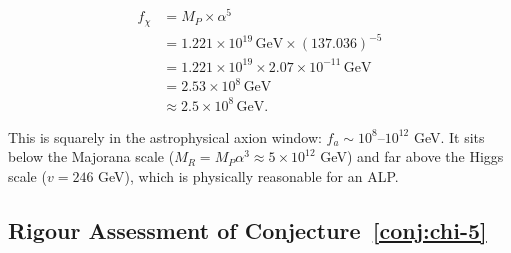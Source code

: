 \documentclass[11pt]{article}
\theoremstyle{definition}
\theoremstyle{remark}
\begin{document}
\begin{align}
f_\chi &= M_P \times \alpha^5 \\
&= 1.221 \times 10^{19}\,\text{GeV} \times (137.036)^{-5} \\
&= 1.221 \times 10^{19} \times 2.07 \times 10^{-11}\,\text{GeV} \\
&= 2.53 \times 10^{8}\,\text{GeV} \\
&\approx 2.5 \times 10^{8}\,\text{GeV}.
\end{align}

This is squarely in the astrophysical axion window: $f_a \sim 10^{8}\text{--}10^{12}$ GeV.
It sits below the Majorana scale ($M_R = M_P\alpha^3 \approx 5 \times 10^{12}$ GeV)
and far above the Higgs scale ($v = 246$ GeV), which is physically reasonable for
an ALP.

\subsection{Rigour Assessment of Conjecture~\ref{conj:chi-5}}
\end{document}
